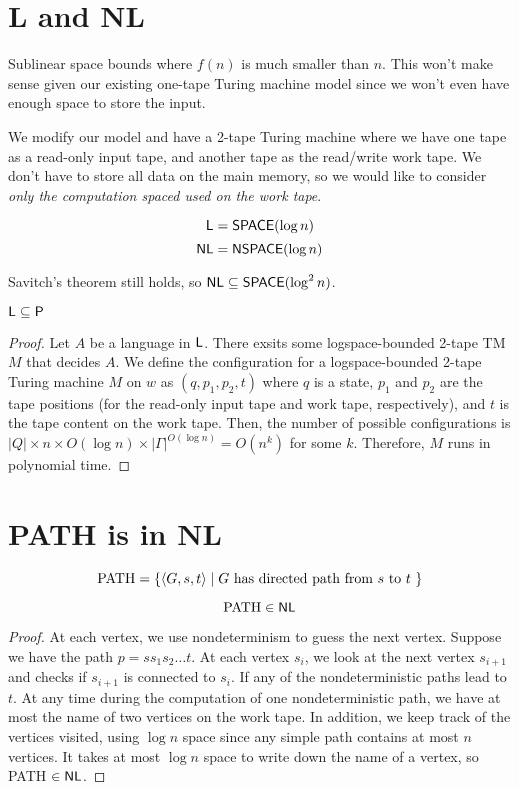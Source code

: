\section{L and NL}

Sublinear space bounds where $f(n)$ is much smaller than $n$. This won't make sense given our existing one-tape Turing machine model since we won't even have enough space to store the input.

We modify our model and have a 2-tape Turing machine where we have one tape as a read-only input tape, and another tape as the read/write work tape. We don't have to store all data on the main memory, so we would like to consider \textit{only the computation spaced used on the work tape}.

$$
\mathsf{L} = \mathsf{SPACE}(\log n)
$$
$$
\mathsf{NL} = \mathsf{NSPACE}(\log n)
$$

Savitch's theorem still holds, so $\mathsf{NL} \subseteq \mathsf{SPACE}(\log^2 n)$.

\begin{theorem}
    $
    \mathsf{L} \subseteq \mathsf{P}
    $
\end{theorem}

\begin{proof}
    Let $A$ be a language in $\mathsf{L}$. There exsits some logspace-bounded 2-tape TM $M$ that decides $A$. We define the configuration for a logspace-bounded 2-tape Turing machine $M$ on $w$ as $(q,p_1,p_2,t)$ where $q$ is a state, $p_1$ and $p_2$ are the tape positions (for the read-only input tape and work tape, respectively), and $t$ is the tape content on the work tape. Then, the number of possible configurations is $|Q| \times n \times O(\log n) \times |\Gamma|^{O(\log n)} = O(n^k)$ for some $k$. Therefore, $M$ runs in polynomial time.
\end{proof}

\section{PATH is in NL}

$$
\text{PATH} = \{ \langle G,s,t \rangle \mid \text{$G$ has directed path from $s$ to $t$ } \}
$$

\begin{theorem}[PATH in NL]
    $$
    \text{PATH} \in \mathsf{NL}
    $$
\end{theorem}

\begin{proof}
    At each vertex, we use nondeterminism to guess the next vertex. Suppose we have the path $p = s s_1 s_2 \ldots t$. At each vertex $s_i$, we look at the next vertex $s_{i+1}$ and checks if $s_{i+1}$ is connected to $s_i$. If any of the nondeterministic paths lead to $t$. At any time during the computation of one nondeterministic path, we have at most the name of two vertices on the work tape. In addition, we keep track of the vertices visited, using $\log n$ space since any simple path contains at most $n$ vertices. It takes at most $\log n$ space to write down the name of a vertex, so PATH $\in \mathsf{NL}$.
\end{proof}

